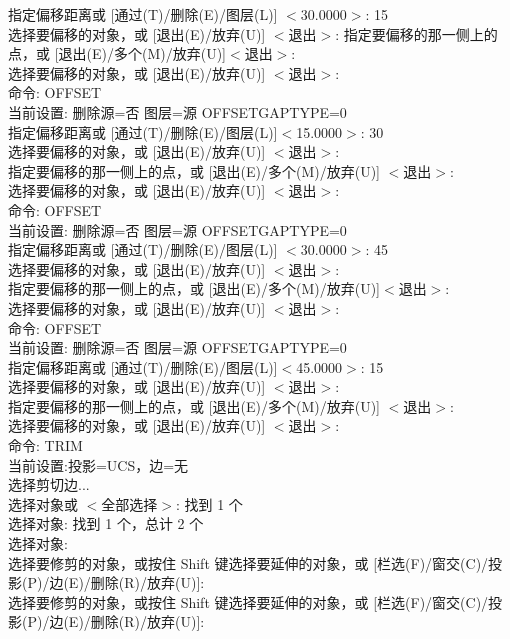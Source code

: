 指定偏移距离或 [通过(T)/删除(E)/图层(L)] $<$30.0000$>$:  15\\
选择要偏移的对象，或 [退出(E)/放弃(U)] $<$退出$>$:
指定要偏移的那一侧上的点，或 [退出(E)/多个(M)/放弃(U)]$ <$退出$>$:\\
选择要偏移的对象，或 [退出(E)/放弃(U)] $<$退出$>$:\\
命令:  OFFSET\\
当前设置: 删除源=否  图层=源  OFFSETGAPTYPE=0\\
指定偏移距离或 [通过(T)/删除(E)/图层(L)]$ <$15.0000$>$:  30\\
选择要偏移的对象，或 [退出(E)/放弃(U)] $<$退出$>$:\\
指定要偏移的那一侧上的点，或 [退出(E)/多个(M)/放弃(U)] $<$退出$>$:\\
选择要偏移的对象，或 [退出(E)/放弃(U)] $<$退出$>$:\\
命令:  OFFSET\\
当前设置: 删除源=否  图层=源  OFFSETGAPTYPE=0\\
指定偏移距离或 [通过(T)/删除(E)/图层(L)] $<$30.0000$>$:  45\\
选择要偏移的对象，或 [退出(E)/放弃(U)] $<$退出$>$:\\
指定要偏移的那一侧上的点，或 [退出(E)/多个(M)/放弃(U)]$ <$退出$>$:\\
选择要偏移的对象，或 [退出(E)/放弃(U)] $<$退出$>$:\\
命令:  OFFSET\\
当前设置: 删除源=否  图层=源  OFFSETGAPTYPE=0\\
指定偏移距离或 [通过(T)/删除(E)/图层(L)]$ <$45.0000$>$:  15\\
选择要偏移的对象，或 [退出(E)/放弃(U)] $<$退出$>$:\\
指定要偏移的那一侧上的点，或 [退出(E)/多个(M)/放弃(U)] $<$退出$>$:\\
选择要偏移的对象，或 [退出(E)/放弃(U)] $<$退出$>$:\\
命令: TRIM\\
当前设置:投影=UCS，边=无\\
选择剪切边...\\
选择对象或 $<$全部选择$>$:  找到 1 个\\
选择对象: 找到 1 个，总计 2 个\\
选择对象:\\
选择要修剪的对象，或按住 Shift 键选择要延伸的对象，或
[栏选(F)/窗交(C)/投影(P)/边(E)/删除(R)/放弃(U)]:\\
选择要修剪的对象，或按住 Shift 键选择要延伸的对象，或
[栏选(F)/窗交(C)/投影(P)/边(E)/删除(R)/放弃(U)]:\\
